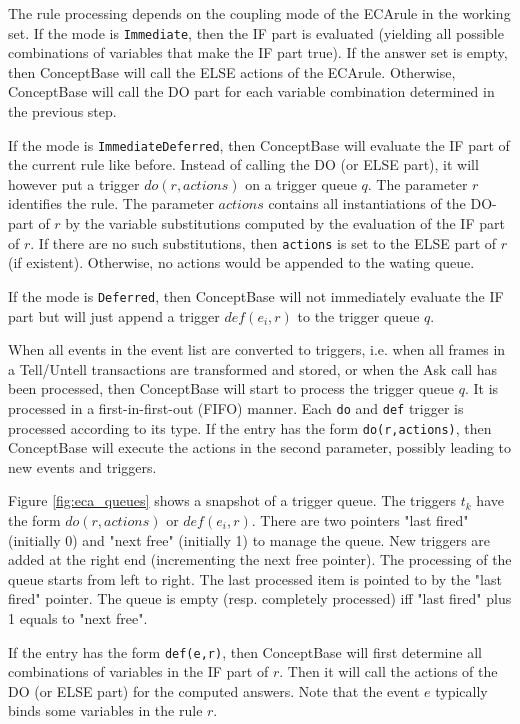 The rule processing depends on the coupling mode of the ECArule in the working set. If the mode is 
{\tt Immediate}, then the IF part is evaluated (yielding all possible combinations
of variables that make the IF part true). If the answer set is empty, then ConceptBase will
call the ELSE actions of the ECArule. Otherwise, ConceptBase will call the DO part
for each variable combination determined in the previous step. 

If the mode is {\tt ImmediateDeferred}, then ConceptBase will evaluate the IF part
of the current rule like before. Instead of calling the DO (or ELSE part), it will
however put a trigger $do(r,actions)$ on a trigger queue $q$.
The parameter $r$ identifies the rule. The parameter $actions$ contains all
instantiations of the DO-part of $r$ by the variable substitutions computed by
the evaluation of the IF part of $r$. If there are no such substitutions, then 
{\tt actions} is set to the ELSE part of $r$ (if existent). Otherwise, no actions would be
appended to the wating queue.

If the mode is {\tt Deferred}, then ConceptBase will not immediately evaluate the IF part 
but will just append a trigger $def(e_i,r)$ to the trigger queue $q$. 


When all events in the event list are converted to triggers, i.e. when all frames in a Tell/Untell
transactions are transformed and stored, or when the Ask call has been processed, then 
ConceptBase will start to process the trigger queue $q$. It is processed in a first-in-first-out (FIFO)
manner. Each {\tt do} and {\tt def} trigger is processed according to its type. If the entry has the form
{\tt do(r,actions)}, then ConceptBase will execute the actions in the second parameter,
possibly leading to new events and triggers.



Figure \ref{fig:eca_queues}  shows a snapshot of a trigger queue. The triggers $t_k$ have the form
$do(r,actions)$ or $def(e_i,r)$. There are two pointers "last fired" (initially 0) and "next free" 
(initially 1) to manage the queue. New triggers are added at the right end (incrementing the next free pointer).
The processing of the queue starts from left to right. The last processed item is pointed to
by the "last fired" pointer. The queue is empty (resp. completely processed) iff 
"last fired" plus 1 equals to "next free".

If the entry has the form {\tt def(e,r)}, then ConceptBase will first determine all
combinations of variables in the IF part of $r$. Then it will call the actions 
of the DO (or ELSE part) for the computed answers. Note that the event $e$ typically 
binds some variables in the rule $r$.

